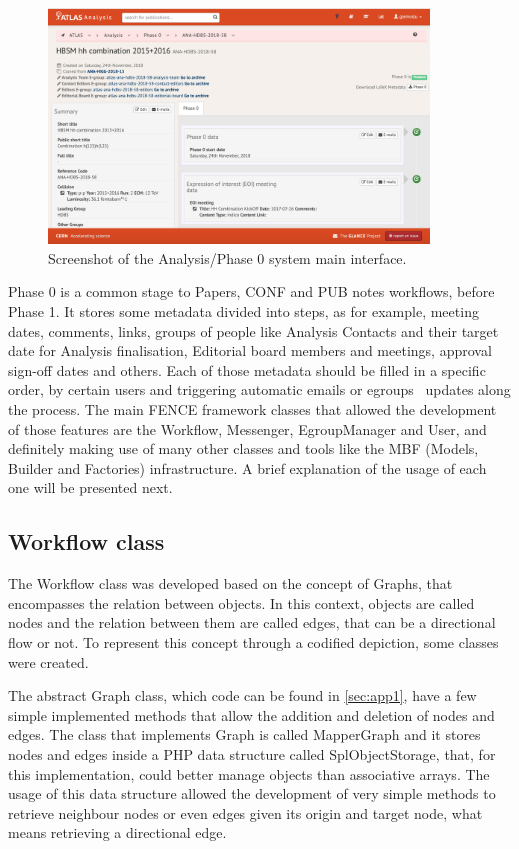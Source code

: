 \begin{figure}[ht!]
  \centering
  \includegraphics[width=0.9\textwidth]{figures/Glance_Papers_Phase0.png}
  \caption{Screenshot of the Analysis/Phase 0 system main interface.}
  \label{fig:Glance_Papers_Phase0}
\end{figure}
Phase 0 is a common stage to Papers, CONF and PUB notes workflows, before Phase 1. It stores some metadata divided into steps, as for example, meeting dates, comments, links, groups of people like Analysis Contacts and their target date for Analysis finalisation, Editorial board members and meetings, approval sign-off dates and others. Each of those metadata should be filled in a specific order, by certain users and triggering automatic emails or egroups~\cite{egroups} updates along the process. The main FENCE framework classes that allowed the development of those features are the Workflow, Messenger, EgroupManager and User, and definitely making use of many other classes and tools like the MBF (Models, Builder and Factories) infrastructure. A brief explanation of the usage of each one will be presented next.

\subsection{Workflow class}
\label{sec:Workflow_class}
The Workflow class was developed based on the concept of Graphs, that encompasses the relation between objects. In this context, objects are called nodes and the relation between them are called edges, that can be a directional flow or not. To represent this concept through a codified depiction, some classes were created. 

The abstract Graph class, which code can be found in \ref{sec:app1}, have a few simple implemented methods that allow the addition and deletion of nodes and edges. The class that implements Graph is called MapperGraph and it stores nodes and edges inside a PHP data structure called SplObjectStorage, that, for this implementation, could better manage objects than associative arrays. The usage of this data structure allowed the development of very simple methods to retrieve neighbour nodes or even edges given its origin and target node, what means retrieving a directional edge.

